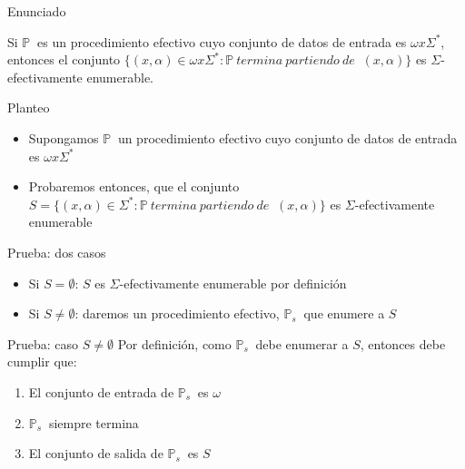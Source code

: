 \documentclass[10pt]{beamer}
\newcommand{\p}{\mathbb{P}}
\begin{document}
\begin{frame}{Enunciado}

    Si $\p\ $ es un procedimiento efectivo cuyo conjunto de datos de entrada es
    $\omega x \Sigma^{*}$, entonces el conjunto $\{(x, \alpha) \in \omega x \Sigma^{*}: \p\ termina\ partiendo\ de\ $
    $ (x, \alpha)\}$ es $\Sigma$-efectivamente enumerable.


\end{frame}

\begin{frame}{Planteo}
  \begin{itemize}[<+->]
    \item Supongamos $\p\ $ un procedimiento efectivo cuyo conjunto de datos de
    entrada es $\omega x \Sigma^{*}$
    \item Probaremos entonces, que el conjunto $S = \{(x, \alpha) \in \Sigma^{*}: \p\ termina\ partiendo\ de\ $
    $ (x, \alpha)\}$ es $\Sigma$-efectivamente enumerable
  \end{itemize}

\end{frame}



\begin{frame}{Prueba: dos casos}
  \begin{itemize}[<+->]
    \item Si $S = \emptyset$: $S$ es $\Sigma$-efectivamente enumerable por definición
    \item Si $S \neq \emptyset$: daremos un procedimiento efectivo, $\p_{s}\ $
    que enumere a $S$
  \end{itemize}

\end{frame}


\begin{frame}{Prueba: caso $S \neq \emptyset$}
  Por definición, como $\p_{s}\ $ debe enumerar a $S$, entonces debe cumplir que:

  \begin{enumerate}[<+->]
    \item El conjunto de entrada de $\p_{s}\ $ es $\omega$
    \item $\p_{s}\ $ siempre termina
    \item El conjunto de salida de $\p_{s}\ $ es $S$
  \end{enumerate}

\end{frame}
\end{document}
